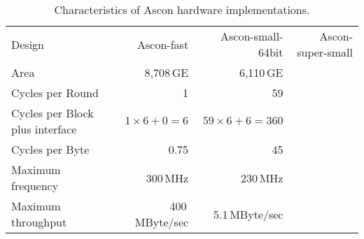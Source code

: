 \documentclass[runningheads]{llncs}
\begin{document}
\begin{table}[htb]
\caption{Characteristics of Ascon hardware implementations.}
\label{tbl:hw-char}
\centering
\begin{tabular}{|l|r|r|r|} \hline
Design & Ascon-fast & Ascon-small-64bit & Ascon-super-small \\
Area   & 8,708\,GE & 6,110\,GE &  \\
Cycles per Round  & 1 & 59 &  \\
Cycles per Block plus interface  & $1 \times 6 + 0 = 6$ & $59 \times 6 + 6 = 360$ &  \\
Cycles per Byte & 0.75 & 45 &  \\
Maximum frequency & 300\,MHz & 230\,MHz &  \\
Maximum throughput  & 400\,MByte/sec & 5.1\,MByte/sec &  \\ \hline
\end{tabular}
\end{table}%




 

\appendix
\end{document}
